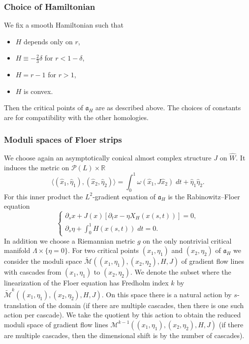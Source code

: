 \documentclass{amsart}
\newcommand{\Mcal}{{\mathcal{M}}}
\newcommand{\Pcal}{{\mathcal{P}}}
\newcommand{\acal}{\mathfrak{a}}
\newcommand{\RR}{\mathbb{R}}
\newcommand{\haat}{\widehat}
\newcommand{\tiilde}{\widetilde}
\theoremstyle{definition}
\theoremstyle{remark}
\numberwithin{equation}{section}
\begin{document}
\subsubsection*{Choice of Hamiltonian}
We fix a smooth Hamiltonian such that
\begin{itemize}
	\item $H$ depends only on $r$,
	\item $H\equiv -\frac23\delta$ for $r<1-\delta$,
	\item $H=r-1$ for $r>1$,
	\item $H$ is convex.
\end{itemize}
Then the critical points of $\acal_H$ are as described above. The choices of constants are for compatibility with the other homologies.

\subsubsection*{Moduli spaces of Floer strips}
We choose again an asymptotically conical almost complex structure $J$ on $\haat W$. It induces the metric on $\Pcal(L)\times\RR$
\begin{equation*}
	\langle(\hat x_1,\hat\eta_1),(\hat x_2,\hat\eta_2)\rangle=\int_0^1\omega(\hat x_1,J\hat x_2)\; dt+\hat\eta_1\hat\eta_2.
\end{equation*}
For this inner product the $L^2$-gradient equation of $\acal_H$ is the Rabinowitz--Floer equation
\begin{equation*}
	\begin{cases}
		\partial_s x+J(x)[\partial_t x-\eta X_H(x(s,t))]=0,\\
		\partial_s\eta +\int_0^1H(x(s,t))\;dt=0.
	\end{cases}
\end{equation*}
In addition we choose a Riemannian metric $g$ on the only nontrivial critical manifold $\Lambda\times\{\eta=0\}$. For two critical points $(x_1,\eta_1)$ and $(x_2,\eta_2)$ of $\acal_H$ we consider the moduli space $\tiilde\Mcal((x_1,\eta_1),(x_2,\eta_2),H,J)$ of gradient flow lines with cascades from $(x_1,\eta_1)$ to $(x_2,\eta_2)$. We denote the subset where the linearization of the Floer equation has Fredholm index $k$ by $\tiilde\Mcal^k((x_1,\eta_1),(x_2,\eta_2),H,J)$. On this space there is a natural action by $s$-translation of the domain (if there are multiple cascades, then there is one such action per cascade). We take the quotient by this action to obtain the reduced moduli space of gradient flow lines $\Mcal^{k-1}((x_1,\eta_1),(x_2,\eta_2),H,J)$ (if there are multiple cascades, then the dimensional shift is by the number of cascades). 
\end{document}
